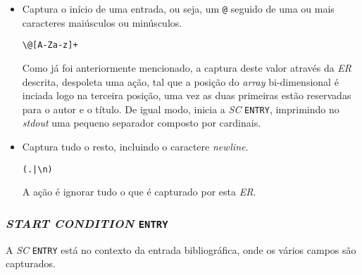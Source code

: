 \begin{itemize}

	\item Captura o início de uma entrada, ou seja, um \texttt{@} seguido de uma
		ou mais caracteres maiúsculos ou minúsculos.

\begin{verbatim}
\@[A-Za-z]+
\end{verbatim}

Como já foi anteriormente mencionado, a captura deste valor através da
\emph{ER} descrita, despoleta uma ação, tal que a posição do \emph{array}
bi-dimensional é inciada logo na terceira posição, uma vez as duas primeiras
estão reservadas para o autor e o título. De igual modo, inicia a \emph{SC}
\texttt{ENTRY}, imprimindo no \emph{stdout} uma pequeno separador composto por
cardinais.

\item Captura tudo o resto, incluindo o caractere \emph{newline}.

\begin{verbatim}
(.|\n)                            
\end{verbatim}

A ação é ignorar tudo o que é capturado por esta \emph{ER}.



\end{itemize}



\subsubsection{\emph{START CONDITION} \texttt{ENTRY}}

A \emph{SC} \texttt{ENTRY} está no contexto da entrada bibliográfica, onde os
vários campos são capturados. 

